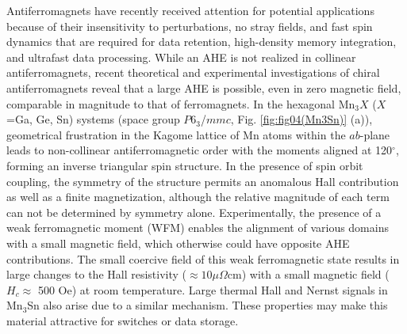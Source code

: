 \documentclass[prb,twocolumn,showpacs,preprintnumbers,amsmath,amssymb]{revtex4}
\begin{document}
Antiferromagnets have recently received  attention for potential applications because of their insensitivity to perturbations, no stray fields, and fast spin dynamics that are required for data retention, high-density memory integration, and ultrafast data processing.\cite{NatureNanotech, arxiv1606, Sci2001} 
While an AHE is not realized in collinear antiferromagnets, recent theoretical and experimental investigations of 
chiral antiferromagnets reveal that a large AHE is possible, even in zero magnetic field, comparable in magnitude to that of ferromagnets.\cite{BinghaiYanPRB95, Nakatsuji2015, NakatsujiMn3Ge, SParkin2016}  
In the hexagonal Mn$_3$$X$ ($X$=Ga, Ge, Sn) systems (space group $P$6$_3$/${mmc}$, Fig. \ref{fig:fig04(Mn3Sn)} (a)), geometrical frustration in the Kagome lattice of Mn atoms within the $ab$-plane leads to non-collinear antiferromagnetic order with the moments aligned at 120$^{\circ}$, forming an inverse triangular spin structure.\cite{TomiyoshiJPSJ, PJBrown}  In the presence of spin orbit coupling, the symmetry of the structure permits an anomalous Hall contribution as well as a finite magnetization, although the relative magnitude of each term can not be determined by symmetry alone. 
Experimentally, the presence of a weak ferromagnetic moment (WFM)\cite{JWCable1993, Nagamiya1979, Nagamiya1982, Tomiyoshi1995, JMMM54, TomiyoshiJPSJ} enables the alignment of various domains with a small magnetic field, which otherwise could have opposite AHE contributions.  The small coercive field of this weak ferromagnetic state results in large changes to the Hall resistivity ($\approx 10 \mu \Omega $cm) with a small magnetic field ($H_c \approx$ 500 Oe) at room temperature.\cite{Nakatsuji2015} Large thermal Hall and Nernst signals in Mn$_3$Sn also arise due to a similar mechanism.\cite{arXiv161206128, Ikhlas2017}
These properties may make this material attractive for switches or data storage. 
 
\end{document}
